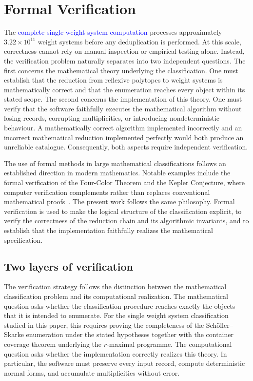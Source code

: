 \documentclass[appliedmath,article,submit,moreauthors]{Definitions/mdpi}
\begin{document}
\section{Formal Verification}
\label{sec:verification}

The \textcolor{blue}{complete single weight system computation} processes approximately \(3.22\times10^{11}\) weight
systems before any deduplication is performed. At this scale, correctness cannot
rely on manual inspection or empirical testing alone. Instead, the verification
problem naturally separates into two independent questions. The first concerns
the mathematical theory underlying the classification. One must establish that
the reduction from reflexive polytopes to weight systems is mathematically
correct and that the enumeration reaches every object within its stated scope.
The second concerns the implementation of this theory. One must verify that the
software faithfully executes the mathematical algorithm without losing records,
corrupting multiplicities, or introducing nondeterministic behaviour. A
mathematically correct algorithm implemented incorrectly and an incorrect
mathematical reduction implemented perfectly would both produce an unreliable
catalogue. Consequently, both aspects require independent verification.

The use of formal methods in large mathematical classifications follows an
established direction in modern mathematics. Notable examples include the formal
verification of the Four-Color Theorem and the Kepler Conjecture, where computer
verification complements rather than replaces conventional mathematical
proofs~\cite{Gonthier2008,Hales2017}. The present work follows the same
philosophy. Formal verification is used to make the logical structure of the
classification explicit, to verify the correctness of the reduction chain and
its algorithmic invariants, and to establish that the implementation faithfully
realizes the mathematical specification.

\subsection{Two layers of verification}
\label{sec:verification-layers}

The verification strategy follows the distinction between the mathematical
classification problem and its computational realization. The mathematical
question asks whether the classification procedure reaches exactly the objects
that it is intended to enumerate. For the single weight system classification
studied in this paper, this requires proving the completeness of the
Sch\"oller--Skarke enumeration under the stated hypotheses together with the
container coverage theorem underlying the \(r\)-maximal programme. The
computational question asks whether the implementation correctly realizes this
theory. In particular, the software must preserve every input record, compute
deterministic normal forms, and accumulate multiplicities without error.
\end{document}
